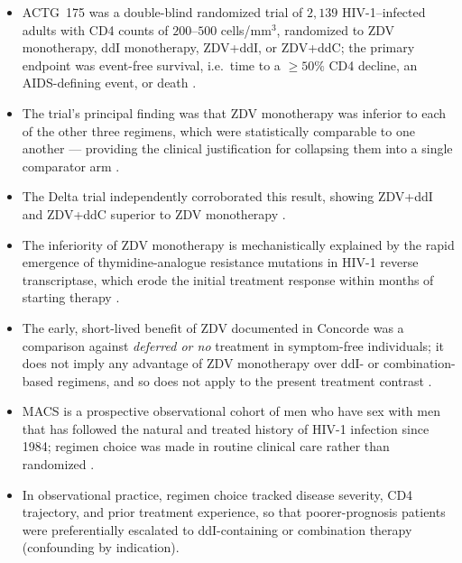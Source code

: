 \documentclass[11pt]{article}
\theoremstyle{plain}
\theoremstyle{definition}
\theoremstyle{remark}
\newcommand{\1}{\mathds{1}}
\begin{document}
\begin{itemize}
  \item ACTG~175 was a double-blind randomized trial of $2{,}139$ HIV-1--infected
        adults with CD4 counts of $200$--$500$ cells/mm$^3$, randomized to ZDV
        monotherapy, ddI monotherapy, ZDV+ddI, or ZDV+ddC; the primary endpoint was
        event-free survival, i.e.\ time to a $\geq 50\%$ CD4 decline, an
        AIDS-defining event, or death \citep{hammer1996}.

  \item The trial's principal finding was that ZDV monotherapy was inferior to each
        of the other three regimens, which were statistically comparable to one
        another --- providing the clinical justification for collapsing them into a
        single comparator arm \citep{hammer1996}.

  \item The Delta trial independently corroborated this result, showing ZDV+ddI and
        ZDV+ddC superior to ZDV monotherapy \citep{delta1996}.

  \item The inferiority of ZDV monotherapy is mechanistically explained by the rapid
        emergence of thymidine-analogue resistance mutations in HIV-1 reverse
        transcriptase, which erode the initial treatment response within months of
        starting therapy \citep{larder1989}.

  \item The early, short-lived benefit of ZDV documented in Concorde was a comparison
        against \emph{deferred or no} treatment in symptom-free individuals; it does
        not imply any advantage of ZDV monotherapy over ddI- or combination-based
        regimens, and so does not apply to the present treatment contrast
        \citep{concorde1994}.

  \item MACS is a prospective observational cohort of men who have sex with men that
        has followed the natural and treated history of HIV-1 infection since 1984;
        regimen choice was made in routine clinical care rather than randomized
        \citep{kaslow1987}.

  \item In observational practice, regimen choice tracked disease severity, CD4
        trajectory, and prior treatment experience, so that poorer-prognosis patients
        were preferentially escalated to ddI-containing or combination therapy
        (confounding by indication).


\end{itemize}
\end{document}

